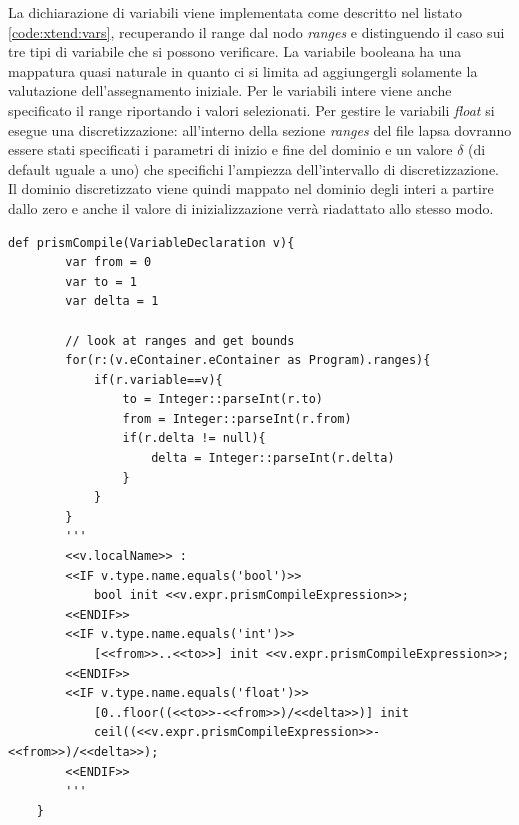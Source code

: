 \vspace{0.4cm}

La dichiarazione di variabili viene implementata come descritto nel listato \ref{code:xtend:vars}, recuperando il range dal nodo \emph{ranges} e distinguendo il caso sui tre tipi di variabile che si possono verificare. La variabile booleana ha una mappatura quasi naturale in quanto ci si limita ad aggiungergli solamente la valutazione dell'assegnamento iniziale. Per le variabili intere viene anche specificato il range riportando i valori selezionati. Per gestire le variabili \emph{float} si esegue una discretizzazione: all'interno della sezione \emph{ranges} del file \ac{lapsa} dovranno essere stati specificati i parametri di inizio e fine del dominio e un valore $\delta$ (di default uguale a uno) che specifichi l'ampiezza dell'intervallo di discretizzazione. Il dominio discretizzato viene quindi mappato nel dominio degli interi a partire dallo zero e anche il valore di inizializzazione verrà riadattato allo stesso modo.

\begin{lstlisting}[language=xtend,style=eclipse,caption={Traduzione della dichiarazione di variabili da \acs{lapsa} a \prism{}},label=code:xtend:vars]
	def prismCompile(VariableDeclaration v){
		var from = 0
		var to = 1
		var delta = 1

		// look at ranges and get bounds
		for(r:(v.eContainer.eContainer as Program).ranges){
			if(r.variable==v){
				to = Integer::parseInt(r.to)
				from = Integer::parseInt(r.from)
				if(r.delta != null){
					delta = Integer::parseInt(r.delta)
				}
			}
		}
		'''
		<<v.localName>> : 
		<<IF v.type.name.equals('bool')>>
			bool init <<v.expr.prismCompileExpression>>;
		<<ENDIF>>
		<<IF v.type.name.equals('int')>>
			[<<from>>..<<to>>] init <<v.expr.prismCompileExpression>>;
		<<ENDIF>>
		<<IF v.type.name.equals('float')>>
			[0..floor((<<to>>-<<from>>)/<<delta>>)] init
			ceil((<<v.expr.prismCompileExpression>>-<<from>>)/<<delta>>);
		<<ENDIF>>
		'''
	}
\end{lstlisting}

\vspace{0.4cm}

